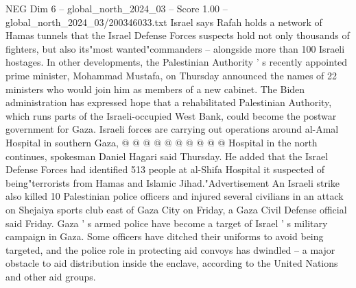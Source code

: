\begin{textsample}{NEG Dim 6 – global\_north\_2024\_03 – Score 1.00 – global\_north\_2024\_03/200346033.txt}
Israel says Rafah holds a network of Hamas tunnels that the Israel Defense Forces suspects hold not only thousands of fighters, but also its"most wanted"commanders -- alongside more than 100 Israeli hostages.
In other developments, the Palestinian Authority ' s recently appointed prime minister, Mohammad Mustafa, on Thursday announced the names of 22 ministers who would join him as members of a new cabinet.
The Biden administration has expressed hope that a rehabilitated Palestinian Authority, which runs parts of the Israeli-occupied West Bank, could become the postwar government for Gaza.
Israeli forces are carrying out operations around al-Amal Hospital in southern Gaza, @ @ @ @ @ @ @ @ @ @ Hospital in the north continues, spokesman Daniel Hagari said Thursday.
He added that the Israel Defense Forces had identified 513 people at al-Shifa Hospital it suspected of being"terrorists from Hamas and Islamic Jihad."Advertisement An Israeli strike also killed 10 Palestinian police officers and injured several civilians in an attack on Shejaiya sports club east of Gaza City on Friday, a Gaza Civil Defense official said Friday.
Gaza ' s armed police have become a target of Israel ' s military campaign in Gaza.
Some officers have ditched their uniforms to avoid being targeted, and the police role in protecting aid convoys has dwindled -- a major obstacle to aid distribution inside the enclave, according to the United Nations and other aid groups.

\end{textsample}
